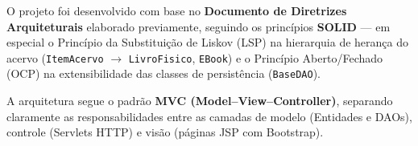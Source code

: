 O projeto foi desenvolvido com base no \textbf{Documento de Diretrizes Arquiteturais} elaborado previamente, seguindo os princípios \textbf{SOLID} --- em especial o Princípio da Substituição de Liskov (LSP) na hierarquia de herança do acervo (\texttt{ItemAcervo} $\rightarrow$ \texttt{LivroFisico}, \texttt{EBook}) e o Princípio Aberto/Fechado (OCP) na extensibilidade das classes de persistência (\texttt{BaseDAO}).

A arquitetura segue o padrão \textbf{MVC (Model--View--Controller)}, separando claramente as responsabilidades entre as camadas de modelo (Entidades e DAOs), controle (Servlets HTTP) e visão (páginas JSP com Bootstrap).
